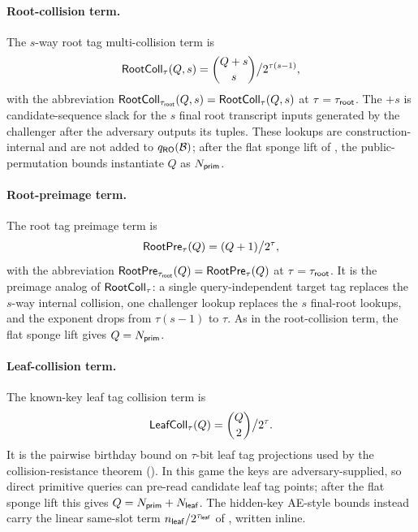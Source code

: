 \paragraph{Root-collision term.}
The $s$-way root tag multi-collision term is
\[
  \mathsf{RootColl}_\tau(Q, s) = \binom{Q + s}{s} \big/ 2^{\tau (s - 1)},
\]
with the abbreviation $\mathsf{RootColl}_{\tau_{\mathsf{root}}}(Q, s) =
\mathsf{RootColl}_\tau(Q, s)$ at $\tau = \tau_{\mathsf{root}}$. The $+s$ is candidate-sequence
slack for the $s$ final root transcript inputs generated by the
challenger after the adversary outputs its tuples. These lookups are
construction-internal and are not added to $q_{\mathsf{RO}}(\mathcal{B})$; after the
flat sponge lift of , the public-permutation
bounds instantiate $Q$ as $N_{\mathsf{prim}}$.

\paragraph{Root-preimage term.}
The root tag preimage term is
\[
  \mathsf{RootPre}_\tau(Q) = (Q + 1) \big/ 2^{\tau},
\]
with the abbreviation $\mathsf{RootPre}_{\tau_{\mathsf{root}}}(Q) = \mathsf{RootPre}_\tau(Q)$ at
$\tau = \tau_{\mathsf{root}}$. It is the preimage analog of $\mathsf{RootColl}_\tau$: a
single query-independent target tag replaces the $s$-way internal
collision, one challenger lookup replaces the $s$ final-root lookups,
and the exponent drops from $\tau(s-1)$ to $\tau$. As in the
root-collision term, the flat sponge lift gives $Q = N_{\mathsf{prim}}$.

\paragraph{Leaf-collision term.}
The known-key leaf tag collision term is
\[
  \mathsf{LeafColl}_\tau(Q) = \binom{Q}{2} \big/ 2^\tau.
\]
It is the pairwise birthday bound on $\tau$-bit leaf tag projections
used by the collision-resistance theorem (). In this game
the keys are adversary-supplied, so direct primitive queries can pre-read
candidate leaf tag points; after the flat sponge lift this gives
$Q=N_{\mathsf{prim}}+N_{\mathsf{leaf}}$. The hidden-key AE-style bounds instead carry the
linear same-slot term $n_{\mathsf{leaf}}/2^{\tau_{\mathsf{leaf}}}$ of
, written inline.
